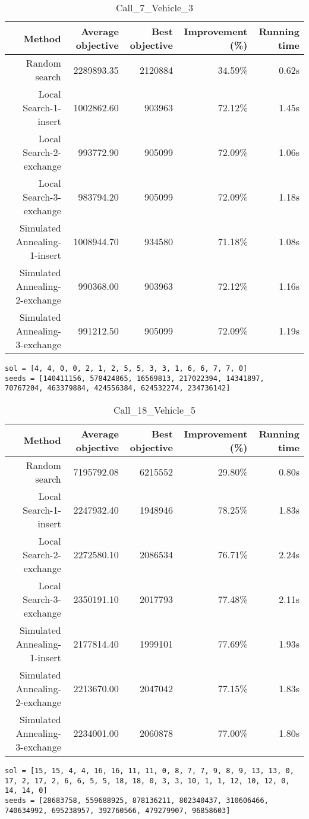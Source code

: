 \begin{table}[ht]
\centering
\caption{Call\_7\_Vehicle\_3}
\label{tab:call7vehicle3}
\begin{tabular}{|r|r|r|r|r|}
Method & Average objective & Best objective & Improvement (\%) & Running time \\
\hline
Random search & 2289893.35 & 2120884 & 34.59\% & 0.62s\\
Local Search-1-insert & 1002862.60 & 903963 & 72.12\% & 1.45s\\
Local Search-2-exchange & 993772.90 & 905099 & 72.09\% & 1.06s\\
Local Search-3-exchange & 983794.20 & 905099 & 72.09\% & 1.18s\\
Simulated Annealing-1-insert & 1008944.70 & 934580 & 71.18\% & 1.08s\\
Simulated Annealing-2-exchange & 990368.00 & 903963 & 72.12\% & 1.16s\\
Simulated Annealing-3-exchange & 991212.50 & 905099 & 72.09\% & 1.19s\\
\end{tabular}%
\end{table}
\begin{lstlisting}[label={lst:call7vehicle3},caption=Optimal solution call\_7\_vehicle\_3]
sol = [4, 4, 0, 0, 2, 1, 2, 5, 5, 3, 3, 1, 6, 6, 7, 7, 0]
seeds = [140411156, 578424865, 16569813, 217022394, 14341897, 70767204, 463379884, 424556384, 624532274, 234736142]
\end{lstlisting}%
\clearpage


\begin{table}[ht]
\centering
\caption{Call\_18\_Vehicle\_5}
\label{tab:call18vehicle5}
\begin{tabular}{|r|r|r|r|r|}
Method & Average objective & Best objective & Improvement (\%) & Running time \\
\hline
Random search & 7195792.08 & 6215552 & 29.80\% & 0.80s\\
Local Search-1-insert & 2247932.40 & 1948946 & 78.25\% & 1.83s\\
Local Search-2-exchange & 2272580.10 & 2086534 & 76.71\% & 2.24s\\
Local Search-3-exchange & 2350191.10 & 2017793 & 77.48\% & 2.11s\\
Simulated Annealing-1-insert & 2177814.40 & 1999101 & 77.69\% & 1.93s\\
Simulated Annealing-2-exchange & 2213670.00 & 2047042 & 77.15\% & 1.83s\\
Simulated Annealing-3-exchange & 2234001.00 & 2060878 & 77.00\% & 1.80s\\
\end{tabular}%
\end{table}
\begin{lstlisting}[label={lst:call18vehicle5},caption=Optimal solution call\_18\_vehicle\_5]
sol = [15, 15, 4, 4, 16, 16, 11, 11, 0, 8, 7, 7, 9, 8, 9, 13, 13, 0, 17, 2, 17, 2, 6, 6, 5, 5, 18, 18, 0, 3, 3, 10, 1, 1, 12, 10, 12, 0, 14, 14, 0]
seeds = [28683758, 559688925, 878136211, 802340437, 310606466, 740634992, 695238957, 392760566, 479279907, 96858603]
\end{lstlisting}%
\clearpage


